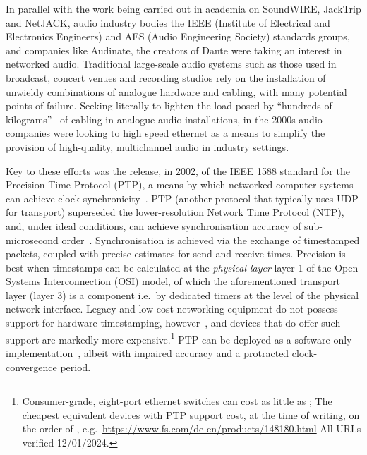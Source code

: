 \documentclass[utf8]{FrontiersinHarvard}
\begin{document}
    In parallel with the work being carried out in academia on SoundWIRE, JackTrip
    and NetJACK, audio industry bodies \textemdash{} the IEEE (Institute of
    Electrical and Electronics Engineers) and AES (Audio Engineering Society)
    standards groups, and companies like Audinate, the creators of Dante
    \textemdash{} were taking an interest in networked audio.
    Traditional large-scale audio systems such as those used in broadcast, concert
    venues and recording studios rely on the installation of unwieldy combinations
    of analogue hardware and cabling, with many potential points of failure.
    Seeking literally to lighten the load posed by ``hundreds of
    kilograms''~\citep{bakker_introduction_2014} of cabling in analogue audio
    installations, in the 2000s audio companies were looking to high speed ethernet
    as a means to simplify the provision of high-quality, multichannel audio in
    industry settings.

    Key to these efforts was the release, in 2002, of the IEEE 1588 standard for
    the Precision Time Protocol (PTP), a means by which networked computer
    systems can achieve clock synchronicity~\citep{edison_ieee-1588_2002}.
    PTP (another protocol that typically uses UDP for transport) superseded the
    lower-resolution Network Time Protocol (NTP), and, under ideal conditions,
    can achieve synchronisation accuracy of sub-microsecond
    order~\citep{tongzhou_research_2022}.
    Synchronisation is achieved via the exchange of timestamped packets, coupled
    with precise estimates for send and receive times.
    Precision is best when timestamps can be calculated at the \textit{physical
    layer} \textemdash{} layer 1 of the Open Systems Interconnection (OSI)
    model, of which the aforementioned transport layer (layer 3) is a component
    \textemdash{} i.e.\ by dedicated timers at the level of the physical network
    interface.
    Legacy and low-cost networking equipment do not possess support for hardware
    timestamping, however~\citep{correll_design_2005}, and devices that do offer
    such support are markedly more expensive.\footnote{
        Consumer-grade, eight-port ethernet switches can cost as little as
        ;
        The cheapest equivalent devices with PTP support cost, at the time of
        writing, on the order of , e.g.\
        \url{https://www.fs.com/de-en/products/148180.html} \textemdash{} All
        URLs verified 12/01/2024.
    }
    PTP can be deployed as a software-only
    implementation~\citep{correll_design_2005}, albeit with impaired accuracy
    and a protracted clock-convergence period.
\end{document}
